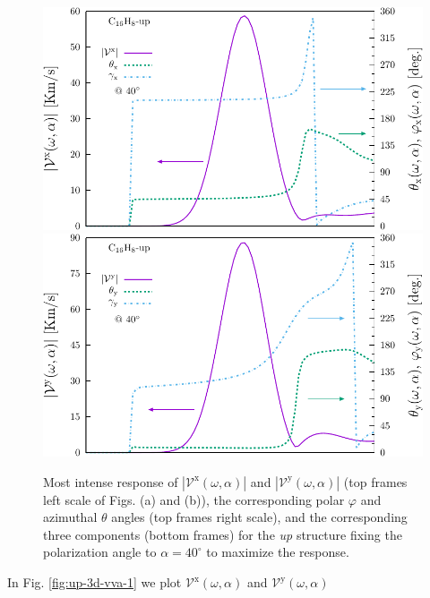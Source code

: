 \documentclass[prb,11pt,tightenlines,twocolumn,aps]{revtex4-1}
\begin{document}
\begin{figure}[t]
    \centering
    \includegraphics[width=\linewidth]{upplots/up-vxb-rtp-m1}
    \\ \vspace{4mm}
    \includegraphics[width=\linewidth]{upplots/up-vyb-rtp-m1}
    
    \caption{Most intense response of
    $|\mathcal{V}^{\mathrm{x}}(\omega,\alpha)|$ and
    $|\mathcal{V}^{\mathrm{y}}(\omega,\alpha)|$ (top frames left scale of Figs.
    (a) and (b)), the corresponding polar $\varphi$ and azimuthal $\theta$
    angles (top frames right scale), and the corresponding three components
    (bottom frames) for the \emph{up} structure fixing the polarization angle
    to $\alpha=40^{\circ}$ to maximize the response.}
    \label{fig:up-vab-comp-rtp-1}
\end{figure}
In Fig. \ref{fig:up-3d-vva-1} we plot
$\mathcal{V}^{\mathrm{x}}(\omega,\alpha)$  
and
$\mathcal{V}^{\mathrm{y}}(\omega,\alpha)$  
\end{document}
